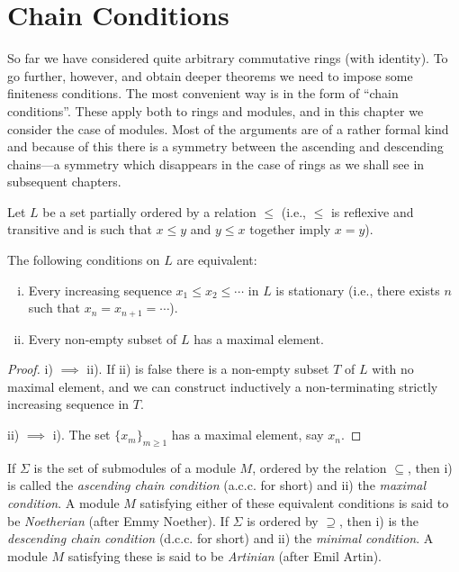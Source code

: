 \chapter{Chain Conditions}\label{chapter6}

So far we have considered quite arbitrary commutative rings (with identity). To go further, however, and obtain deeper theorems we need to impose some finiteness conditions. The most convenient way is in the form of ``chain conditions''. These apply both to rings and modules, and in this chapter we consider the case of modules. Most of the arguments are of a rather formal kind and because of this there is a symmetry between the ascending and descending chains---a symmetry which disappears in the case of rings as we shall see in subsequent chapters.

Let $L$ be a set partially ordered by a relation $\leq$ (i.e., $\leq$ is reflexive and transitive and is such that $x \leq y$ and $y \leq x$ together imply $x = y$).

\begin{proposition}\label{prop:chain-equivalent}
The following conditions on $L$ are equivalent:
\begin{enumerate}[i)]
    \item Every increasing sequence $x_1 \leq x_2 \leq \cdots$ in $L$ is stationary (i.e., there exists $n$ such that $x_n = x_{n+1} = \cdots$).
    \item Every non-empty subset of $L$ has a maximal element.
\end{enumerate}
\end{proposition}

\begin{proof}
i) $\implies$ ii). If ii) is false there is a non-empty subset $T$ of $L$ with no maximal element, and we can construct inductively a non-terminating strictly increasing sequence in $T$.

ii) $\implies$ i). The set $\{x_m\}_{m \geq 1}$ has a maximal element, say $x_n$.
\end{proof}

If $\Sigma$ is the set of submodules of a module $M$, ordered by the relation $\subseteq$, then  
i) is called the \emph{ascending chain condition} (a.c.c. for short) and ii) the \emph{maximal condition}. A module $M$ satisfying either of these equivalent conditions is said  
to be \emph{Noetherian} (after Emmy Noether). If $\Sigma$ is ordered by $\supseteq$, then i) is the \emph{descending chain condition} (d.c.c. for short) and ii) the \emph{minimal condition}. A module $M$ satisfying these is said to be \emph{Artinian} (after Emil Artin).

